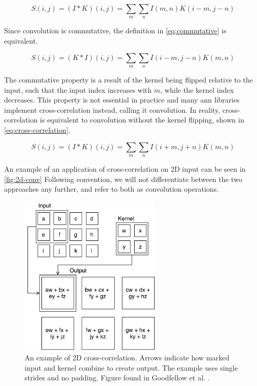 \begin{equation}
\label{eq:2d-kernel}
S(i, j) = (I*K)(i, j) = \sum_{m} \sum_{n} I(m, n) K(i-m, j-n)
\end{equation} 

\noindent Since convolution is commutative, the definition in \autoref{eq:commutative} is equivalent.

\begin{equation}
\label{eq:commutative}
S(i, j) = (K*I)(i, j) = \sum_{m} \sum_{n} I(i-m, j-n) K(m, n)
\end{equation} 

\noindent The commutative property is a result of the kernel being flipped relative to the input, such that the input index increases with $m$, while the kernel index decreases. This property is not essential in practice and many \acrshort{ann} libraries implement cross-correlation instead, calling it convolution. In reality, cross-correlation is equivalent to convolution without the kernel flipping, shown in \autoref{eq:cross-correlation}.

\begin{equation}
\label{eq:cross-correlation}
S(i, j) = (I*K)(i, j) = \sum_{m} \sum_{n} I(i+m, j+n) K(m, n)
\end{equation} 

\noindent An example of an application of cross-correlation on 2D input can be seen in \autoref{fig:2d-conv} Following convention, we will not differentiate between the two approaches any further, and refer to both as convolution operations. 

\begin{figure}[h!]
    \centering
        \includegraphics[width=0.6\textwidth]{fig/2d_conv.pdf}
        \caption[An example of 2D cross-correlation.]{An example of 2D cross-correlation. Arrows indicate how marked input and kernel combine to create output. The example uses single strides and no padding. Figure found in Goodfellow et al.  \cite{conv-net-book}.}
        \label{fig:2d-conv}
\end{figure}
 
